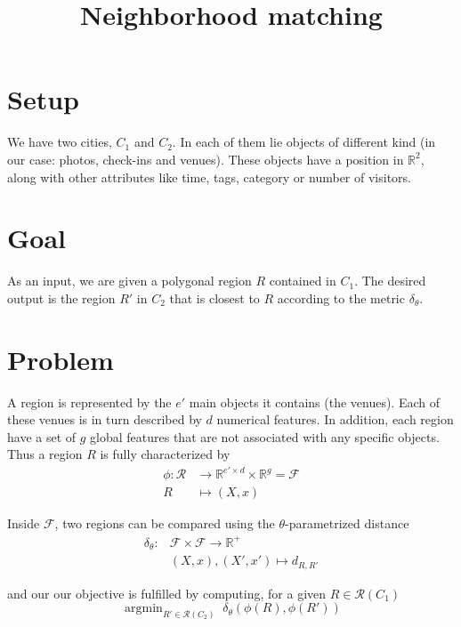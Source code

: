\documentclass[a4paper,11pt,draft]{scrartcl}
\title{Neighborhood matching}
\DeclareMathOperator*{\argmin}{argmin}
\begin{document}
\maketitle
\section*{Setup}
We have two cities, $C_1$ and $C_2$. In each of them lie objects of different
kind (in our case: photos, check-ins and venues). These objects have a
position in $\mathbb{R}^2$, along with other attributes like time, tags,
category or number of visitors.

\section*{Goal}

As an input, we are given a polygonal region $R$ contained in $C_1$. The
desired output is the region $R'$ in $C_2$ that is closest to $R$ according
to the metric $\delta_{\theta}$.

\section*{Problem}

A region is represented by the $e'$ main objects it contains (the venues).
Each of these venues is in turn described by $d$ numerical features. In
addition, each region have a set of $g$ global features that are not
associated with any specific objects. Thus a region $R$ is fully characterized
by
\begin{align*}
	\phi \colon \mathcal{R} &\to
	\mathbb{R}^{e'\times d} \times \mathbb{R}^g = \mathcal{F} \\
	R &\mapsto (X, x)
\end{align*}

Inside $\mathcal{F}$, two regions can be compared using the
$\theta$-parametrized distance
\begin{align*}
	\delta_{\theta} \colon &\mathcal{F} \times \mathcal{F} \to
	\mathbb{R}^+ \\
	&(X, x) , (X', x') \mapsto d_{R,R'}
\end{align*}

and our our objective is fulfilled by computing, for a given $R \in
\mathcal{R}(C_1)$
\begin{equation}
	\argmin_{R' \in \mathcal{R}(C_2)}\; \delta_{\theta}
	\left(\phi(R), \phi(R')\right)
	\label{e:onetheta}
\end{equation}
\end{document}
